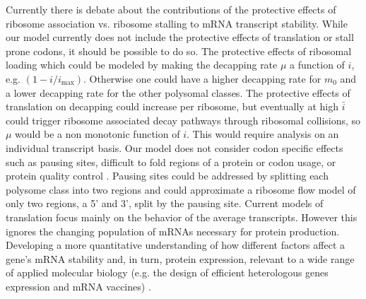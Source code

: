 \documentclass[a4,center,fleqn,nocrop]{NAR}
\newcommand{\imax}{\ensuremath{{i_{\max}}}\xspace}
\newcommand{\MRL}{\ensuremath{\bar{i}}\xspace}
\begin{document}
Currently there is debate about the contributions of the protective effects of ribosome association vs. ribosome stalling to mRNA transcript stability.
While our model currently does not include the protective effects of translation or stall prone codons, it should be possible to do so.
The protective effects of ribosomal loading which could be modeled by making the decapping rate $\mu $ a function of $i$, e.g. $(1-i/\imax)$. Otherwise one could have a higher decapping rate for $m_0$ and a lower decapping rate for the other polysomal classes.
The protective effects of translation on decapping could increase per ribosome, but eventually at high \MRL could trigger ribosome associated decay pathways through ribosomal collisions, so $\mu$ would be a non monotonic function of $i$. This would require analysis on an individual transcript basis.
Our model does not consider codon specific effects such as pausing sites, difficult to fold regions of a protein or codon usage, or protein quality control \citep{RN39}.
Pausing sites could be addressed by splitting each polysome class into two regions and could approximate a ribosome flow model of only two regions, a 5' and 3', split by the pausing site. Current models of translation focus mainly on the behavior of the average transcripts. However this ignores the changing population of mRNAs necessary for protein production. 
Developing a more quantitative understanding of how different factors affect a gene's mRNA stability and, in turn, protein expression, relevant to a wide range of applied molecular biology (e.g. the design of efficient heterologous genes expression and mRNA vaccines) \citep{RN40}.
\end{document}
